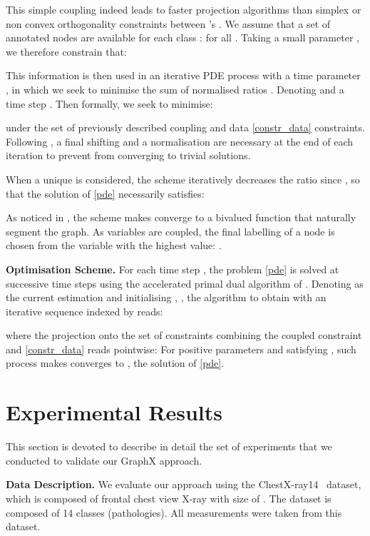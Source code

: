 \documentclass[runningheads]{llncs}
\begin{document}
This simple coupling indeed leads to faster projection algorithms than simplex  \cite{bresson2013multiclass,gao2015medical} or non convex orthogonality constraints between 's \cite{dodero2014group}. We assume that a set of annotated nodes  are available for each class :  for all . Taking a small parameter , we therefore constrain that:

This information is then used in an iterative PDE process with a time parameter , in which we seek to minimise the  sum of normalised ratios .  Denoting  and a time step . Then formally, we seek to minimise:

under the set of   previously described coupling  and data \eqref{constr_data} constraints.
Following \cite{hein2013total,Feld2019}, a final shifting  and  a  normalisation  are necessary at the end of each iteration to prevent from converging to trivial solutions.

When a unique  is considered, the scheme iteratively decreases the ratio  since , so that the solution  of \eqref{pde} necessarily satisfies:

As noticed in \cite{Feld2019}, the  scheme  makes  converge to a bivalued function that naturally segment the graph. As   variables are coupled, the final labelling of a node  is chosen from   the variable   with the highest value: .

\textbf{Optimisation Scheme.} For each time step , the problem \eqref{pde} is solved at successive time steps using the accelerated primal dual algorithm of \cite{chambolle2011first}. Denoting as  the current estimation and initialising , , the algorithm to obtain  with an iterative sequence  indexed by  reads:

where the projection onto the set of constraints  combining the coupled constraint and \eqref{constr_data} reads pointwise: 
For positive parameters  and  satisfying , such process makes  converges to ,
the solution of \eqref{pde}.

\section{Experimental Results}
This section is devoted to describe in detail the set of experiments that we conducted to validate our GraphX approach. \medskip





\noindent
\textbf{Data Description.} We evaluate our approach using the ChestX-ray14~\cite{wang2017chestx} dataset, which is composed of  frontal chest view X-ray with size of . The dataset is composed of 14 classes (pathologies).  All measurements were taken from this dataset.
\end{document}
